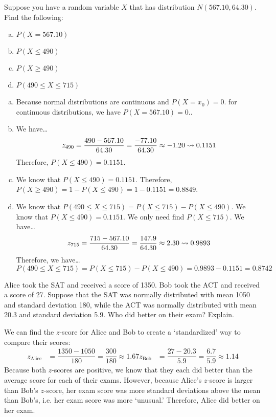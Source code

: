 \documentclass[11pt,letterpaper]{article}
\begin{document}

 Suppose you have a random variable $X$ that has distribution $N(567.10, 64.30)$. Find the following:
	\begin{enumerate}[(a)]
	\item $P(X= 567.10)$
	\item $P(X \leq 490)$
	\item $P(X \geq 490)$
	\item $P(490 \leq X \leq 715)$
	\end{enumerate} \pspace

\sol 
\begin{enumerate}[(a)]
\item Because normal distributions are continuous and $P(X= x_0)= 0.$ for continuous distributions, we have $P(X= 567.10)= 0.$. \pspace

\item We have\dots
	\[
	z_{490}= \dfrac{490 - 567.10}{64.30}= \dfrac{-77.10}{64.30} \approx -1.20 \rightsquigarrow 0.1151
	\]
Therefore, $P(X \leq 490)= 0.1151$. \pspace

\item We know that $P(X \leq 490)= 0.1151$. Therefore, $P(X \geq 490)= 1 - P(X \leq 490)= 1 - 0.1151= 0.8849$. \pspace

\item We know that $P(490 \leq X \leq 715)= P(X \leq 715) - P(X \leq 490)$. We know that $P(X \leq 490)= 0.1151$. We only need find $P(X \leq 715)$. We have\dots
	\[
	z_{715}= \dfrac{715 - 567.10}{64.30}= \dfrac{147.9}{64.30} \approx 2.30 \rightsquigarrow 0.9893
	\]
Therefore, we have\dots
	\[
	P(490 \leq X \leq 715)= P(X \leq 715) - P(X \leq 490)= 0.9893 - 0.1151= 0.8742
	\]
\end{enumerate}



\newpage



 Alice took the SAT and received a score of 1350. Bob took the ACT and received a score of 27. Suppose that the SAT was normally distributed with mean 1050 and standard deviation 180, while the ACT was normally distributed with mean 20.3 and standard deviation 5.9. Who did better on their exam? Explain. \pspace

\sol We can find the $z$-score for Alice and Bob to create a `standardized' way to compare their scores: 
	\[
	\begin{aligned}
	z_{\text{Alice}}&= \dfrac{1350 - 1050}{180}= \dfrac{300}{180} \approx 1.67 
	z_{\text{Bob}}&= \dfrac{27 - 20.3}{5.9}= \dfrac{6.7}{5.9} \approx 1.14
	\end{aligned}
	\] \pspace
Because both $z$-scores are positive, we know that they each did better than the average score for each of their exams. However, because Alice's $z$-score is larger than Bob's $z$-score, her exam score was more standard deviations above the mean than Bob's, i.e. her exam score was more `unusual.' Therefore, Alice did better on her exam. 
\end{document}
